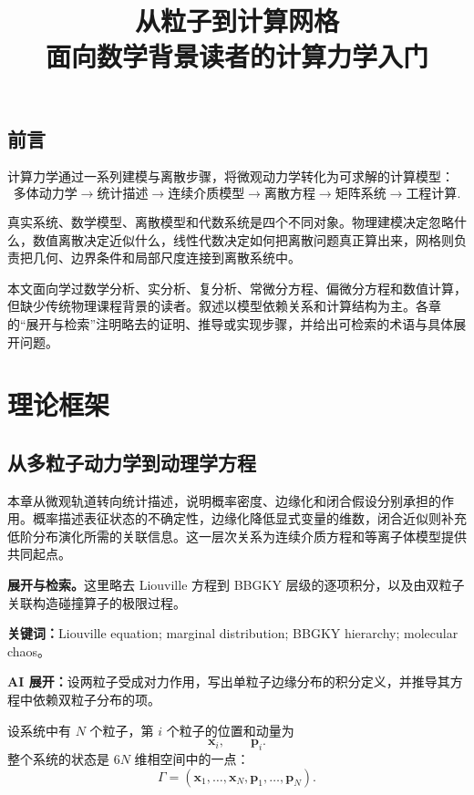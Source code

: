 \documentclass[11pt,openany]{ctexbook}
\title{从粒子到计算网格\\
\large 面向数学背景读者的计算力学入门}
\author{}
\date{}
\newcommand{\studyroute}[3]{%
  \par\smallskip\noindent\textbf{展开与检索。}#1\par
  \noindent\textbf{关键词：}#2。\par
  \noindent\textbf{AI 展开：}#3\par
}
\begin{document}
\maketitle
\tableofcontents

\chapter*{前言}
计算力学通过一系列建模与离散步骤，将微观动力学转化为可求解的计算模型：
\[
\text{多体动力学}
\longrightarrow
\text{统计描述}
\longrightarrow
\text{连续介质模型}
\longrightarrow
\text{离散方程}
\longrightarrow
\text{矩阵系统}
\longrightarrow
\text{工程计算}.
\]

真实系统、数学模型、离散模型和代数系统是四个不同对象。物理建模决定忽略什么，数值离散决定近似什么，线性代数决定如何把离散问题真正算出来，网格则负责把几何、边界条件和局部尺度连接到离散系统中。

本文面向学过数学分析、实分析、复分析、常微分方程、偏微分方程和数值计算，但缺少传统物理课程背景的读者。叙述以模型依赖关系和计算结构为主。各章的“展开与检索”注明略去的证明、推导或实现步骤，并给出可检索的术语与具体展开问题。

\part{理论框架}

\chapter{从多粒子动力学到动理学方程}

\begin{chaptersummary}
本章从微观轨道转向统计描述，说明概率密度、边缘化和闭合假设分别承担的作用。概率描述表征状态的不确定性，边缘化降低显式变量的维数，闭合近似则补充低阶分布演化所需的关联信息。这一层次关系为连续介质方程和等离子体模型提供共同起点。
\end{chaptersummary}
\studyroute{这里略去 Liouville 方程到 BBGKY 层级的逐项积分，以及由双粒子关联构造碰撞算子的极限过程。}{Liouville equation; marginal distribution; BBGKY hierarchy; molecular chaos}{设两粒子受成对力作用，写出单粒子边缘分布的积分定义，并推导其方程中依赖双粒子分布的项。}

设系统中有 \(N\) 个粒子，第 \(i\) 个粒子的位置和动量为
\[
\bm x_i,\qquad \bm p_i.
\]
整个系统的状态是 \(6N\) 维相空间中的一点：
\[
\Gamma=
(\bm x_1,\dots,\bm x_N,\bm p_1,\dots,\bm p_N).
\]
\end{document}
